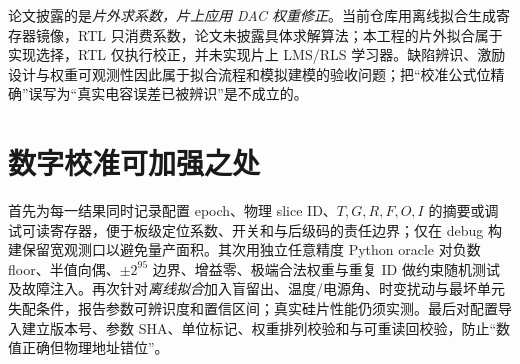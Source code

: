 \documentclass[UTF8,fontset=fandol,11pt,a4paper,openany]{ctexrep}
\begin{document}
论文披露的是\emph{片外求系数，片上应用 DAC 权重修正}。当前仓库用离线拟合生成寄存器镜像，RTL 只消费系数，论文未披露具体求解算法；本工程的片外拟合属于实现选择，RTL 仅执行校正，并未实现片上 LMS/RLS 学习器。缺陷辨识、激励设计与权重可观测性因此属于拟合流程和模拟建模的验收问题；把“校准公式位精确”误写为“真实电容误差已被辨识”是不成立的。

\section{数字校准可加强之处}
首先为每一结果同时记录配置 epoch、物理 slice ID、\(T,G,R,F,O,I\) 的摘要或调试可读寄存器，便于板级定位系数、开关和与后级码的责任边界；仅在 debug 构建保留宽观测口以避免量产面积。其次用独立任意精度 Python oracle 对负数 floor、半值向偶、\(\pm2^{95}\) 边界、增益零、极端合法权重与重复 ID 做约束随机测试及故障注入。再次针对\emph{离线拟合}加入盲留出、温度/电源角、时变扰动与最坏单元失配条件，报告参数可辨识度和置信区间；真实硅片性能仍须实测。最后对配置导入建立版本号、参数 SHA、单位标记、权重排列校验和与可重读回校验，防止“数值正确但物理地址错位”。


\end{document}
